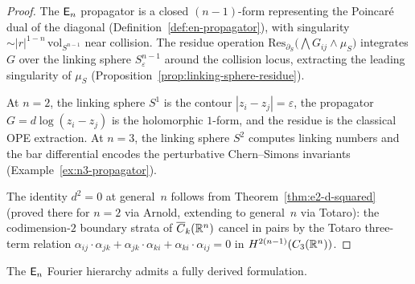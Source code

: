 \begin{proof}
The $\mathsf{E}_n$ propagator is a closed $(n{-}1)$-form representing the
Poincar\'e dual of the diagonal
(Definition~\ref{def:en-propagator}), with singularity
$\sim |r|^{1-n}\, \mathrm{vol}_{S^{n-1}}$ near collision.  The
residue operation
$\mathrm{Res}_{\partial_S}\bigl(\bigwedge G_{ij} \wedge \mu_S\bigr)$
integrates $G$ over the linking sphere
$S^{n-1}_\varepsilon$ around the collision locus, extracting the
leading singularity of $\mu_S$
(Proposition~\ref{prop:linking-sphere-residue}).

At $n = 2$, the linking sphere $S^1$ is the contour
$|z_i - z_j| = \varepsilon$, the propagator
$G = d\log(z_i - z_j)$ is the holomorphic $1$-form, and the
residue is the classical OPE extraction.  At $n = 3$, the linking
sphere $S^2$ computes linking numbers and the bar differential
encodes the perturbative Chern--Simons invariants
(Example~\ref{ex:n3-propagator}).

The identity $d^2 = 0$ at general~$n$ follows from
Theorem~\ref{thm:e2-d-squared} (proved there for $n = 2$ via
Arnold, extending to general~$n$ via Totaro): the
codimension-$2$ boundary strata of $\overline{C}_k(\mathbb{R}^n)$
cancel in pairs by the Totaro three-term relation
$\alpha_{ij} \cdot \alpha_{jk} + \alpha_{jk} \cdot \alpha_{ki}
+ \alpha_{ki} \cdot \alpha_{ij} = 0$ in
$H^{2(n-1)}(C_3(\mathbb{R}^n))$.
\end{proof}

The $\mathsf{E}_n$ Fourier hierarchy admits a fully derived formulation.

